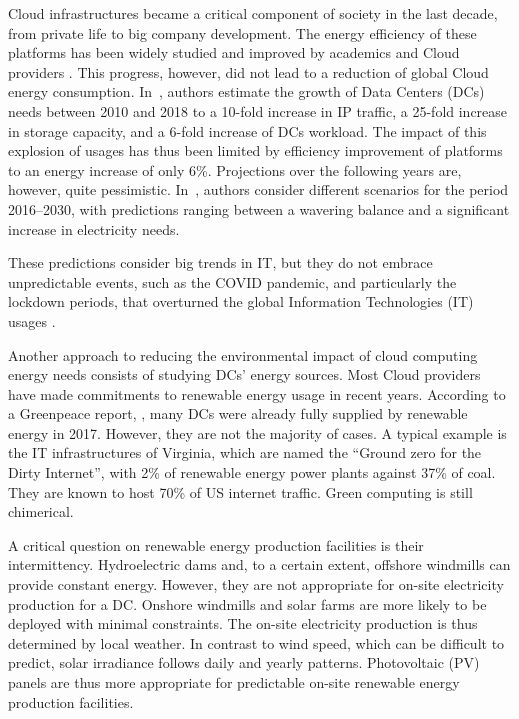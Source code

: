 
Cloud infrastructures became a critical component of society in the
last decade, from private life to big company development. The energy
efficiency of these platforms has been widely studied and improved by
academics and Cloud providers \cite{muralidhar2020energy}. This
progress, however, did not lead to a reduction of global Cloud energy
consumption. In~\cite{masanet2020recalibrating}, authors estimate the
growth of Data Centers (DCs) needs between 2010 and 2018 to a 10-fold
increase in IP traffic, a 25-fold increase in storage capacity, and a
6-fold increase of DCs workload. The impact of this explosion of
usages has thus been limited by efficiency improvement of platforms to
an energy increase of only 6\%. Projections over the following years
are, however, quite pessimistic. In~\cite{koot2021usage}, authors
consider different scenarios for the period 2016--2030, with
predictions ranging between a wavering balance and a significant
increase in electricity needs.


These predictions consider big trends in IT, but they do not embrace
unpredictable events, such as the COVID pandemic, and particularly the
lockdown periods, that overturned the global Information Technologies
(IT) usages \cite{feldmann2021implications}.


Another approach to reducing the environmental impact of cloud
computing energy needs consists of studying DCs' energy sources. Most
Cloud providers have made commitments to renewable energy usage in
recent years. According to a Greenpeace report, \cite{greenpeace2017},
many DCs were already fully supplied by renewable energy in
2017. However, they are not the majority of cases. A typical example
is the IT infrastructures of Virginia, which are named the ``Ground
zero for the Dirty Internet'', with 2\% of renewable energy power
plants against 37\% of coal. They are known to host 70\% of US
internet traffic. Green computing is still chimerical.


A critical question on renewable energy production facilities is their
intermittency. Hydroelectric dams and, to a certain extent, offshore
windmills can provide constant energy. However, they are not
appropriate for on-site electricity production for a DC. Onshore
windmills and solar farms are more likely to be deployed with minimal
constraints. The on-site electricity production is thus determined by
local weather. In contrast to wind speed, which can be difficult to
predict, solar irradiance follows daily and yearly
patterns. Photovoltaic (PV) panels are thus more appropriate for
predictable on-site renewable energy production facilities.





